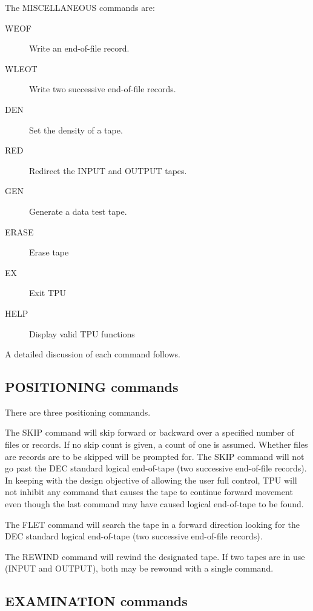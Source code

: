 The MISCELLANEOUS commands are:

\begin{description}
\begin{description}
\item[WEOF~~~~]	Write an end-of-file record.
\item[WLEOT~~~]	Write two successive end-of-file records.
\item[DEN~~~~~]	Set the density of a tape.
\item[RED~~~~~]	Redirect the INPUT and OUTPUT tapes.
\item[GEN~~~~~]	Generate a data test tape.
\item[ERASE~~~]	Erase tape
\item[EX~~~~~~]	Exit TPU
\item[HELP~~~~]	Display valid TPU functions
\end{description}
\end{description}

A detailed discussion of each command follows.

\subsection{POSITIONING commands}

There are three positioning commands.

The SKIP command will skip forward or backward over a specified number of files
or records.
If no skip count is given, a count of one is assumed.
Whether files are records are to be skipped will be prompted for.
The SKIP command will not go past the DEC standard logical end-of-tape (two
successive end-of-file records).
In keeping with the design objective of allowing the user full control, TPU will
not inhibit any command that causes the tape to continue forward movement even
though the last command may have caused logical end-of-tape to be found.

The FLET command will search the tape in a forward direction looking for the DEC
standard logical end-of-tape (two successive end-of-file records).

The REWIND command will rewind the designated tape.
If two tapes are in use (INPUT and OUTPUT), both may be rewound with a single
command.

\subsection{EXAMINATION commands}

